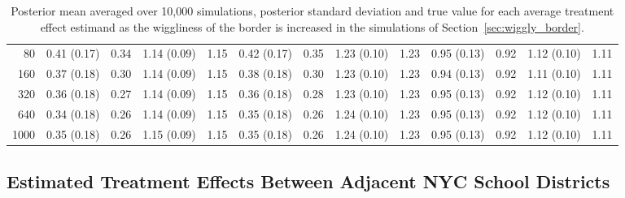 \documentclass[letter]{article}
\begin{document}
\begin{landscape}
\begin{table}[!h]
\begin{tabular}{r|rrrrrrrrrrrr}
80       & 0.41 (0.17) & 0.34    & 1.14 (0.09) & 1.15   & 0.42 (0.17) & 0.35   & 1.23 (0.10) & 1.23    & 0.95 (0.13) & 0.92   & 1.12 (0.10) & 1.11   \\
160      & 0.37 (0.18) & 0.30    & 1.14 (0.09) & 1.15   & 0.38 (0.18) & 0.30   & 1.23 (0.10) & 1.23    & 0.94 (0.13) & 0.92   & 1.11 (0.10) & 1.11   \\
320      & 0.36 (0.18) & 0.27    & 1.14 (0.09) & 1.15   & 0.36 (0.18) & 0.28   & 1.23 (0.10) & 1.23    & 0.95 (0.13) & 0.92   & 1.12 (0.10) & 1.11   \\
640      & 0.34 (0.18) & 0.26    & 1.14 (0.09) & 1.15   & 0.35 (0.18) & 0.26   & 1.24 (0.10) & 1.23    & 0.95 (0.13) & 0.92   & 1.12 (0.10) & 1.11   \\
1000     & 0.35 (0.18) & 0.26    & 1.15 (0.09) & 1.15   & 0.35 (0.18) & 0.26   & 1.24 (0.10) & 1.23    & 0.95 (0.13) & 0.92   & 1.12 (0.10) & 1.11 
\\    \hline
	\end{tabular}
	\caption{Posterior mean averaged over 10,000 simulations, posterior standard deviation and true value for each average treatment effect estimand as the wiggliness of the border is increased in the simulations of Section \ref{sec:wiggly_border}.}
\end{table}

\pagebreak
    	\hypertarget{nyc-school-district-estimated-treatment-effects}{%
\subsection{Estimated Treatment Effects Between Adjacent NYC School Districts}\label{nyc-school-district-estimated-treatment-effects}}
    


\end{landscape}
\end{document}
